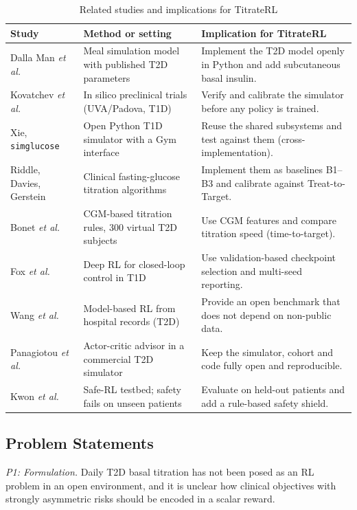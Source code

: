 \documentclass[conference]{IEEEtran}
\begin{document}
\begin{table}[t]
\centering
\caption{Related studies and implications for TitrateRL}
\label{tab:related}
\scriptsize
\begin{tabular}{@{}p{3.3cm}p{6.3cm}p{7.6cm}@{}}
\toprule
\textbf{Study} & \textbf{Method or setting} & \textbf{Implication for TitrateRL} \\
\midrule
Dalla Man \emph{et al.} \cite{dallaman2007} & Meal simulation model with published T2D parameters & Implement the T2D model openly in Python and add subcutaneous basal insulin. \\
Kovatchev \emph{et al.} \cite{kovatchev2009} & In silico preclinical trials (UVA/Padova, T1D) & Verify and calibrate the simulator before any policy is trained. \\
Xie, \texttt{simglucose} \cite{simglucose} & Open Python T1D simulator with a Gym interface & Reuse the shared subsystems and test against them (cross-implementation). \\
Riddle, Davies, Gerstein \cite{riddle2003,davies2005,gerstein2006} & Clinical fasting-glucose titration algorithms & Implement them as baselines B1--B3 and calibrate against Treat-to-Target. \\
Bonet \emph{et al.} \cite{bonet2025} & CGM-based titration rules, 300 virtual T2D subjects & Use CGM features and compare titration speed (time-to-target). \\
Fox \emph{et al.} \cite{fox2020} & Deep RL for closed-loop control in T1D & Use validation-based checkpoint selection and multi-seed reporting. \\
Wang \emph{et al.} \cite{wang2023} & Model-based RL from hospital records (T2D) & Provide an open benchmark that does not depend on non-public data. \\
Panagiotou \emph{et al.} \cite{panagiotou2025} & Actor-critic advisor in a commercial T2D simulator & Keep the simulator, cohort and code fully open and reproducible. \\
Kwon \emph{et al.} \cite{kwon2026} & Safe-RL testbed; safety fails on unseen patients & Evaluate on held-out patients and add a rule-based safety shield. \\
\bottomrule
\end{tabular}
\end{table}

\subsection{Problem Statements}
\emph{P1: Formulation.} Daily T2D basal titration has not been posed as an RL problem in an open
environment, and it is unclear how clinical objectives with strongly asymmetric risks should be
encoded in a scalar reward.
\end{document}
